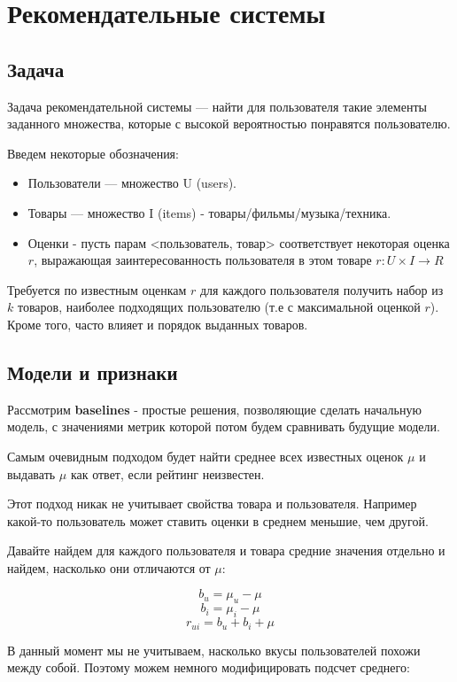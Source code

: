  \section{Рекомендательные системы}
 
 \subsection{Задача}
 Задача рекомендательной системы — найти для пользователя такие элементы заданного множества, которые с высокой вероятностью понравятся пользователю.
 
 Введем некоторые обозначения:
 \begin{itemize}
     \item Пользователи — множество U (users).
     \item Товары — множество I (items) - товары/фильмы/музыка/техника.
     \item Оценки - пусть парам <пользователь, товар> соответствует некоторая оценка $r$, выражающая заинтересованность пользователя в этом товаре $r: U \times I \rightarrow R$
 \end{itemize}
 
 Требуется по известным оценкам $r$ для каждого пользователя получить набор из $k$
 товаров, наиболее подходящих пользователю (т.е с максимальной оценкой $r$). Кроме того, часто влияет и порядок выданных товаров. 
 
 \subsection{Модели и признаки}
 
 Рассмотрим \textbf{baselines} - простые решения, позволяющие сделать начальную модель, с значениями метрик которой потом будем сравнивать будущие модели.
 
 Самым очевидным подходом будет найти среднее всех известных оценок $\mu$ и выдавать $\mu$ как ответ, если рейтинг неизвестен.
 
 Этот подход никак не учитывает свойства товара и пользователя. Например какой-то пользователь может ставить оценки в среднем меньшие, чем другой.
 
 Давайте найдем для каждого пользователя и товара средние значения отдельно и найдем, насколько они отличаются от $\mu$:
 
 $$b_u = \mu_u - \mu$$
 $$b_i = \mu_i - \mu$$
 $$r_{ui} = b_u + b_i + \mu$$ 
 
 В данный момент мы не учитываем, насколько вкусы пользователей похожи между собой. Поэтому можем немного модифицировать подсчет среднего:
 
